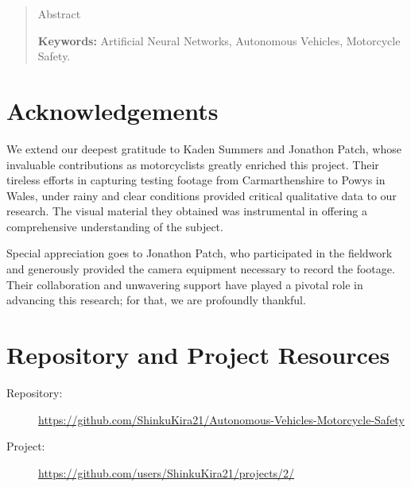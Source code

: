 \documentclass[12pt]{report} %
\begin{document}
\renewcommand\abstractname{\large\bfseries\filcenter\uppercase{Summary}}
\begin{abstract}
	\thispagestyle{plain}
	\setcounter{page}{3}

	Abstract

	\textbf{Keywords:} %
	Artificial Neural Networks, Autonomous Vehicles, Motorcycle Safety.
	\vfill
\end{abstract}
\newpage %
\thispagestyle{empty}
\mbox{}
\chapter*{Acknowledgements}

\setcounter{page}{5}
We extend our deepest gratitude to Kaden Summers and Jonathon Patch, whose invaluable contributions as motorcyclists greatly enriched this project. Their tireless efforts in capturing testing footage from Carmarthenshire to Powys in Wales, under rainy and clear conditions provided critical qualitative data to our research. The visual material they obtained was instrumental in offering a comprehensive understanding of the subject.
	
Special appreciation goes to Jonathon Patch, who participated in the fieldwork and generously provided the camera equipment necessary to record the footage. Their collaboration and unwavering support have played a pivotal role in advancing this research; for that, we are profoundly thankful.	
\vfill

\newpage %
\thispagestyle{empty}
\mbox{}

\chapter*{Repository and Project Resources}
\setcounter{page}{6}
	\begin{description}
		\item[Repository:] \href{https://github.com/ShinkuKira21/Autonomous-Vehicles-Motorcycle-Safety}{https://github.com/ShinkuKira21/Autonomous-Vehicles-Motorcycle-Safety}
		\item[Project:] \href{https://github.com/users/ShinkuKira21/projects/2/}{https://github.com/users/ShinkuKira21/projects/2/}
  	\end{description}
\vfill

\newpage %
\thispagestyle{empty}
\mbox{}
\end{document}
